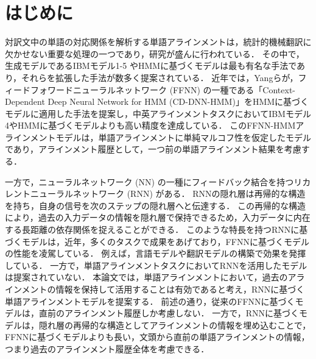 \documentclass[japanese]{jnlp_1.4}
\begin{document}
\maketitle


\section{はじめに}
\label{sect:intro}

対訳文中の単語の対応関係を解析する単語アラインメントは，統計的機械翻訳に欠かせない重要な処理の一つであり，研究が盛んに行われている．
その中で，生成モデルであるIBMモデル1-5 \cite{brown93}やHMMに基づくモデル\cite{vogel96}は最も有名な手法であり，それらを拡張した手法が数多く提案されている\cite{och03,taylor10}．
近年では，Yangらが，フィードフォワードニューラルネットワーク (FFNN) の一種である「Context-Dependent Deep Neural Network for HMM (CD-DNN-HMM)」\cite{dahl12}をHMMに基づくモデルに適用した手法を提案し，中英アラインメントタスクにおいてIBMモデル4やHMMに基づくモデルよりも高い精度を達成している\cite{yang13}．
このFFNN-HMMアラインメントモデルは，単語アラインメントに単純マルコフ性を仮定したモデルであり，アラインメント履歴として，一つ前の単語アラインメント結果を考慮する．

一方で，ニューラルネットワーク (NN) の一種にフィードバック結合を持つリカレントニューラルネットワーク (RNN) がある．
RNNの隠れ層は再帰的な構造を持ち，自身の信号を次のステップの隠れ層へと伝達する．
この再帰的な構造により，過去の入力データの情報を隠れ層で保持できるため，入力データに内在する長距離の依存関係を捉えることができる．
このような特長を持つRNNに基づくモデルは，近年，多くのタスクで成果をあげており，FFNNに基づくモデルの性能を凌駕している．
例えば，言語モデル\cite{mikolov10,mikolov12,sundermeyer13}や翻訳モデル\cite{auli13,nal13}の構築で効果を発揮している．
一方で，単語アラインメントタスクにおいてRNNを活用したモデルは提案されていない．
本論文では，単語アラインメントにおいて，過去のアラインメントの情報を保持して活用することは有効であると考え，RNNに基づく単語アラインメントモデルを提案する．
前述の通り，従来のFFNNに基づくモデルは，直前のアラインメント履歴しか考慮しない．
一方で，RNNに基づくモデルは，隠れ層の再帰的な構造としてアラインメントの情報を埋め込むことで，FFNNに基づくモデルよりも長い，文頭から直前の単語アラインメントの情報，つまり過去のアラインメント履歴全体を考慮できる．
\end{document}
